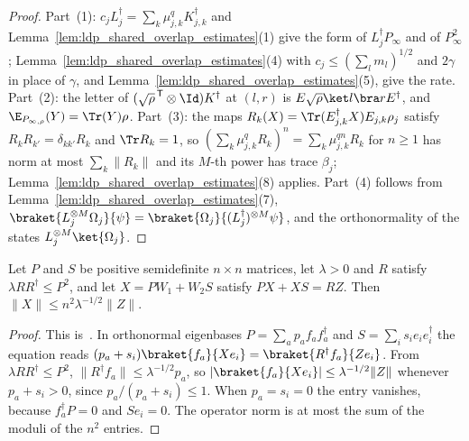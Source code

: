 \begin{proof}
    \leanok
    Part~(1): $c_jL_j^\dagger=\sum_k\mu_{j,k}^qK_{j,k}^\dagger$ and
    Lemma~\ref{lem:ldp_shared_overlap_estimates}(1) give the form of $L_j^\dagger P_\infty$
    and of $P_\infty^2$; Lemma~\ref{lem:ldp_shared_overlap_estimates}(4) with
    $c_j\leq(\sum_lm_l)^{1/2}$ and $2\gamma$ in place of $\gamma$, and
    Lemma~\ref{lem:ldp_shared_overlap_estimates}(5), give the rate. Part~(2): the letter of
    $(\sqrt\rho^{\,\mathsf T}\otimes\Id)K^\dagger$ at $(l,r)$ is
    $E\sqrt\rho\ket l\bra rE^\dagger$, and $\E_{P_{\infty,\rho}}(Y)=\Tr(Y)\rho$. Part~(3): the maps
    $R_k(X)=\Tr(E_{j,k}^\dagger X)E_{j,k}\rho_j$ satisfy $R_kR_{k'}=\delta_{kk'}R_k$ and
    $\Tr R_k=1$, so $(\sum_k\mu_{j,k}^qR_k)^n=\sum_k\mu_{j,k}^{qn}R_k$ for $n\geq1$ has norm
    at most $\sum_k\lVert R_k\rVert$ and its $M$-th power has trace $\beta_j$;
    Lemma~\ref{lem:ldp_shared_overlap_estimates}(8) applies. Part~(4) follows from
    Lemma~\ref{lem:ldp_shared_overlap_estimates}(7),
    $\braket{L_j^{\otimes M}\Omega_j}{\psi}=\braket{\Omega_j}{(L_j^\dagger)^{\otimes M}\psi}$,
    and the orthonormality of the states $L_j^{\otimes M}\ket{\Omega_j}$.
\end{proof}

\begin{lemma}
    \label{lem:ldp_sylvester_bound}
    \leanok
    Let $P$ and $S$ be positive semidefinite $n\times n$ matrices, let $\lambda>0$ and $R$
    satisfy $\lambda RR^\dagger\leq P^2$, and let $X=PW_1+W_2S$ satisfy $PX+XS=RZ$. Then
    $\lVert X\rVert\leq n^2\lambda^{-1/2}\lVert Z\rVert$.
\end{lemma}
\begin{proof}
    \leanok
    This is~\cite[``A Sylvester equation with positive
        coefficients'']{QICLean2026Blueprint}.
    In orthonormal eigenbases $P=\sum_ap_af_af_a^\dagger$ and $S=\sum_is_ie_ie_i^\dagger$ the
    equation reads $(p_a+s_i)\braket{f_a}{Xe_i}=\braket{R^\dagger f_a}{Ze_i}$. From
    $\lambda RR^\dagger\leq P^2$, $\lVert R^\dagger f_a\rVert\leq\lambda^{-1/2}p_a$, so
    $\lvert\braket{f_a}{Xe_i}\rvert\leq\lambda^{-1/2}\lVert Z\rVert$ whenever
    $p_a+s_i>0$, since $p_a/(p_a+s_i)\leq1$. When $p_a=s_i=0$ the entry vanishes, because
    $f_a^\dagger P=0$ and $Se_i=0$. The operator norm is at most the sum of the moduli of
    the $n^2$ entries.
\end{proof}

